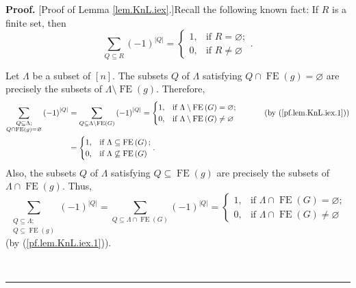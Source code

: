 \documentclass[numbers=enddot,12pt,final,onecolumn,notitlepage]{scrartcl}%
\theoremstyle{definition}
\newenvironment{proof}[1][Proof]{\noindent\textbf{#1.} }{\ \rule{0.5em}{0.5em}}
\let\sumnonlimits\sum
\renewcommand{\sum}{\sumnonlimits\limits}
\begin{document}
\begin{proof}
[Proof of Lemma \ref{lem.KnL.iex}.]Recall the following known fact: If $R$ is
a finite set, then%
\begin{equation}
\sum_{Q\subseteq R}\left(  -1\right)  ^{\left\vert Q\right\vert }=%
\begin{cases}
1, & \text{if }R=\varnothing;\\
0, & \text{if }R\neq\varnothing
\end{cases}
. \label{pf.lem.KnL.iex.1}%
\end{equation}


Let $\Lambda$ be a subset of $\left[  n\right]  $. The subsets $Q$ of
$\Lambda$ satisfying $Q\cap\operatorname*{FE}\left(  g\right)  =\varnothing$
are precisely the subsets of $\Lambda\setminus\operatorname*{FE}\left(
g\right)  $. Therefore,
\begin{align}
\sum_{\substack{Q\subseteq\Lambda;\\Q\cap\operatorname*{FE}\left(  g\right)
=\varnothing}}\left(  -1\right)  ^{\left\vert Q\right\vert }  &
=\sum_{Q\subseteq\Lambda\setminus\operatorname*{FE}\left(  G\right)  }\left(
-1\right)  ^{\left\vert Q\right\vert }=%
\begin{cases}
1, & \text{if }\Lambda\setminus\operatorname*{FE}\left(  G\right)
=\varnothing;\\
0, & \text{if }\Lambda\setminus\operatorname*{FE}\left(  G\right)
\neq\varnothing
\end{cases}
\ \ \ \ \ \ \ \ \ \ \left(  \text{by (\ref{pf.lem.KnL.iex.1})}\right)
\nonumber\\
&  =%
\begin{cases}
1, & \text{if }\Lambda\subseteq\operatorname*{FE}\left(  G\right)  ;\\
0, & \text{if }\Lambda\not \subseteq \operatorname*{FE}\left(  G\right)
\end{cases}
. \label{pf.lem.KnL.iex.2}%
\end{align}
Also, the subsets $Q$ of $\Lambda$ satisfying $Q\subseteq\operatorname*{FE}%
\left(  g\right)  $ are precisely the subsets of $\Lambda\cap
\operatorname*{FE}\left(  g\right)  $. Thus,%
\begin{equation}
\sum_{\substack{Q\subseteq\Lambda;\\Q\subseteq\operatorname*{FE}\left(
g\right)  }}\left(  -1\right)  ^{\left\vert Q\right\vert }=\sum_{Q\subseteq
\Lambda\cap\operatorname*{FE}\left(  G\right)  }\left(  -1\right)
^{\left\vert Q\right\vert }=%
\begin{cases}
1, & \text{if }\Lambda\cap\operatorname*{FE}\left(  G\right)  =\varnothing;\\
0, & \text{if }\Lambda\cap\operatorname*{FE}\left(  G\right)  \neq\varnothing
\end{cases}
\label{pf.lem.KnL.iex.3}%
\end{equation}
(by (\ref{pf.lem.KnL.iex.1})).


\end{proof}
\end{document}
